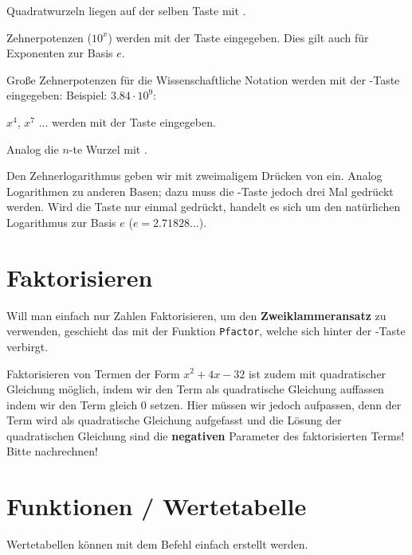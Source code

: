 Quadratwurzeln liegen auf der selben Taste
mit  .


Zehnerpotenzen ($10^x$) werden mit der Taste  eingegeben. Dies gilt auch für Exponenten zur Basis $e$.

Große Zehnerpotenzen\label{ee} für die Wissenschaftliche Notation werden mit der -Taste eingegeben: Beispiel: $3.84 \cdot{} 10^9$:\\

$x^4$, $x^7$ ... werden mit der Taste  eingegeben.

Analog die $n$-te Wurzel mit .

Den Zehnerlogarithmus geben wir mit zweimaligem Drücken
von   ein. Analog Logarithmen zu anderen
Basen; dazu muss die -Taste jedoch drei Mal gedrückt
werden.
Wird die Taste  nur einmal gedrückt, handelt es sich um
den natürlichen Logarithmus zur Basis $e$ ($e = 2.71828...$).



\section{Faktorisieren}\label{faktorisieren}


Will man einfach nur Zahlen Faktorisieren, \zB um den \textbf{Zweiklammeransatz} zu verwenden, geschieht das mit der Funktion \texttt{Pfactor}, welche sich hinter der -Taste verbirgt.

Faktorisieren von Termen der Form $x^2 +4x -32$ ist zudem mit
quadratischer Gleichung möglich, indem wir den Term als quadratische
Gleichung auffassen indem wir den Term gleich 0 setzen. Hier müssen wir jedoch aufpassen, denn der Term wird als quadratische Gleichung aufgefasst und die Lösung der quadratischen Gleichung sind die \textbf{negativen} Parameter des faktorisierten Terms! Bitte nachrechnen!
\newpage

\section{Funktionen / Wertetabelle}\label{wertetabelle}
Wertetabellen können mit dem Befehl  einfach erstellt
werden.

